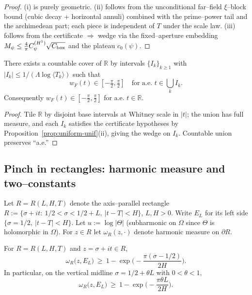\begin{proof}
(i) is purely geometric. (ii) follows from the unconditional far–field $\xi$–block bound (cubic decay + horizontal annuli) combined with the prime–power tail and the archimedean part; each piece is independent of $T$ under the scale law. (iii) follows from the certificate $\Rightarrow$ wedge via the fixed–aperture embedding $M_\psi\le \tfrac{4}{\pi}C_\psi^{(H^1)}\sqrt{C_{\rm box}}$ and the plateau $c_0(\psi)$.
\end{proof}

\begin{lemma}\label{lem:globalwedge-unif}
There exists a countable cover of $\mathbb{R}$ by intervals $\{I_k\}_{k\ge 1}$ with $|I_k|\le 1/(\Lambda\log\langle T_k\rangle)$ such that
\[w_F(t)\in[-\tfrac{\pi}{2},\tfrac{\pi}{2}]\quad\text{for a.e. }t\in \bigcup_k I_k.\]
Consequently $w_F(t)\in[-\tfrac{\pi}{2},\tfrac{\pi}{2}]$ for a.e. $t\in\mathbb{R}$.
\end{lemma}

\begin{proof}
Tile $\mathbb{R}$ by disjoint base intervals at Whitney scale in $|t|$; the union has full measure, and each $I_k$ satisfies the certificate hypotheses by Proposition~\ref{prop:uniform-unif}(ii), giving the wedge on $I_k$. Countable union preserves “a.e.”
\end{proof}

\subsection*{Pinch in rectangles: harmonic measure and two–constants}

Let $R=R(L,H,T)$ denote the axis–parallel rectangle $R:=\{\sigma+it:\ 1/2<\sigma<1/2+L,\ |t-T|<H\}$, $L,H>0$. Write $E_L$ for its left side $\{\sigma=1/2,\ |t-T|<H\}$. Let $u:=\log|\Theta|$ (subharmonic on $\Omega$ since $\Theta$ is holomorphic in $\Omega$). For $z\in R$ let $\omega_R(z,\cdot)$ denote harmonic measure on $\partial R$.

\begin{lemma}\label{lem:hm-rect-unif}
For $R=R(L,H,T)$ and $z=\sigma+it\in R$,
\[\omega_R\big(z,E_L\big)\ \ge\ 1-\exp\!\Big(-\frac{\pi(\sigma-1/2)}{2H}\Big).\]
In particular, on the vertical midline $\sigma=1/2+\theta L$ with $0<\theta<1$,
\[\omega_R\big(z,E_L\big)\ \ge\ 1-\exp\!\Big(-\frac{\pi\theta L}{2H}\Big).\]
\end{lemma}

